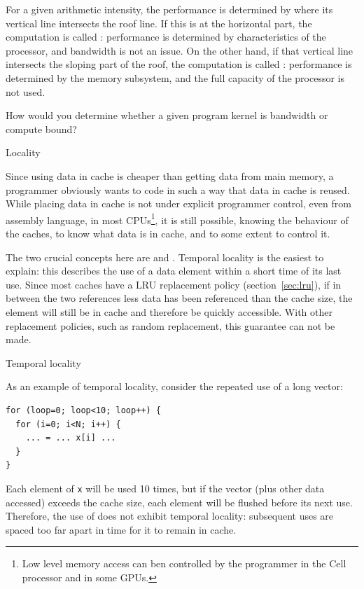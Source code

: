 For a given arithmetic intensity, the performance is determined by
where its vertical line intersects the roof line. If this is at the
horizontal part, the computation is called :
performance is determined by characteristics of the processor, and
bandwidth is not an issue. On the other hand, if that vertical line
intersects the sloping part of the roof, the computation is called
: performance is determined by the memory
subsystem, and the full capacity of the processor is not used.


\begin{exercise}
  How would you determine whether a given program kernel is bandwidth
  or compute bound?
\end{exercise}

 {Locality}
\label{sec:locality}

Since using data in cache is cheaper than getting data from main
memory, a programmer obviously wants to code in such a way that data
in cache is reused. While placing data in cache is not under explicit
programmer control, even from assembly language, in most
CPUs\footnote{Low level memory access can ben controlled by the
  programmer in the Cell processor and in some GPUs.}, it is still
possible, knowing the behaviour of the caches, to know
what data is in cache, and to some extent to control it.

The two crucial concepts here are
 and
. Temporal locality is the easiest to explain: this
describes the use of a data element within a short time of its last
use.  Since most caches have a \ac{LRU} replacement policy
(section~\ref{sec:lru}), if in between the two references less data
has been referenced than the cache size, the element will still be in
cache and therefore be quickly accessible. With other replacement
policies, such as random replacement, this guarantee can not be made.

 {Temporal locality}

As an example of temporal locality, consider the repeated use of a
long vector:
\begin{verbatim}
for (loop=0; loop<10; loop++) {
  for (i=0; i<N; i++) {
    ... = ... x[i] ...
  }
}
\end{verbatim}
Each element of \texttt{x} will be used 10 times, but if the vector
(plus other data accessed) exceeds
the cache size, each element will be flushed before its
next use. Therefore, the use of  does not exhibit temporal
locality: subsequent uses are spaced too far apart in time for it to
remain in cache. 

